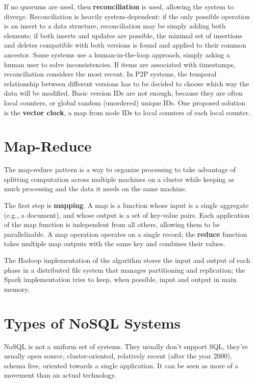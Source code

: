 If no quorums are used, then \textbf{reconciliation} is used, allowing the system to diverge. Reconciliation is heavily system-dependent: if the only possible operation is an insert to a data structure, reconciliation may be simply adding both elements; if both inserts and updates are possible, the minimal set of insertions and deletes compatible with both versions is found and applied to their common ancestor. Some systems use a human-in-the-loop approach, simply asking a human user to solve inconsistencies. If items are associated with timestamps, reconciliation considers the most recent. In P2P systems, the temporal relationship between different versions has to be decided to choose which way the data will be modified. Basic version IDs are not enough, because they are often local counters, or global random (unordered) unique IDs. One proposed solution is the \textbf{vector clock}, a map from node IDs to local counters of each local counter.

\section{Map-Reduce}

The map-reduce pattern is a way to organize processing to take advantage of splitting computation across multiple machines on a cluster while keeping as much processing and the data it needs on the same machine.

The first step is \textbf{mapping}. A map is a function whose input is a single aggregate (e.g., a document), and whose output is a set of key-value pairs. Each application of the map function is independent from all others, allowing them to be parallelizable. A map operation operates on a single record; the \textbf{reduce} function takes multiple map outputs with the same key and combines their values.

The Hadoop implementation of the algorithm stores the input and output of each phase in a distributed file system that manages partitioning and replication; the Spark implementation tries to keep, when possible, input and output in main memory.

\section{Types of NoSQL Systems}

NoSQL is not a uniform set of systems. They usually don't support SQL, they're usually open source, cluster-oriented, relatively recent (after the year 2000), schema free, oriented towards a single application. It can be seen as more of a movement than an actual technology.

